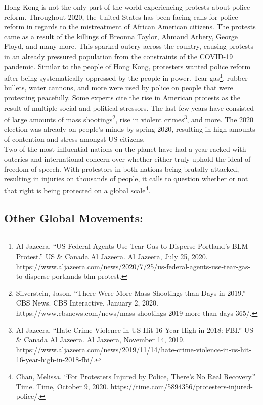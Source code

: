 \documentclass[10pt, letterpaper]{article}
\begin{document}
Hong Kong is not the only part of the world experiencing protests about
police reform. Throughout 2020, the United States has been facing calls
for police reform in regards to the mistreatment of African American
citizens. The protests came as a result of the killings of Breonna
Taylor, Ahmaud Arbery, George Floyd, and many more. This sparked outcry
across the country, causing protests in an already pressured population
from the constraints of the COVID-19 pandemic. Similar to
the people of Hong Kong, protesters wanted police reform after being
systematically oppressed by the people in power. Tear gas\footnote{Al
  Jazeera. ``US Federal Agents Use Tear Gas to Disperse Portland's BLM
  Protest.'' US \& Canada \textbar{} Al Jazeera. Al Jazeera, July 25,
  2020.
  https://www.aljazeera.com/news/2020/7/25/us-federal-agents-use-tear-gas-to-disperse-portlands-blm-protest.},
rubber bullets, water cannons, and more were used by police on people
that were protesting peacefully. Some experts cite the rise in American
protests as the result of multiple social and political stressors. The
last few years have consisted of large amounts of mass
shootings\footnote{Silverstein, Jason. ``There Were More Mass Shootings
  than Days in 2019.'' CBS News. CBS Interactive, January 2, 2020.
  https://www.cbsnews.com/news/mass-shootings-2019-more-than-days-365/.},
rise in violent crimes\footnote{Al Jazeera. ``Hate Crime Violence in US
  Hit 16-Year High in 2018: FBI.'' US \& Canada \textbar{} Al Jazeera.
  Al Jazeera, November 14, 2019.
  https://www.aljazeera.com/news/2019/11/14/hate-crime-violence-in-us-hit-16-year-high-in-2018-fbi/.},
and more. The 2020 election was already on people's minds by spring
2020, resulting in high amounts of contention and stress amongst US
citizens. \\

Two of the most influential nations on the planet have had a year racked
with outcries and international concern over whether either truly uphold
the ideal of freedom of speech. With protestors in both nations being
brutally attacked, resulting in injuries on thousands of people, it
calls to question whether or not that right is being protected on a
global scale\footnote{Chan, Melissa. ``For Protesters Injured by Police,
  There's No Real Recovery.'' Time. Time, October 9, 2020.
  https://time.com/5894356/protesters-injured-police/.}. \\

\subsection{Other Global Movements:}
\end{document}
